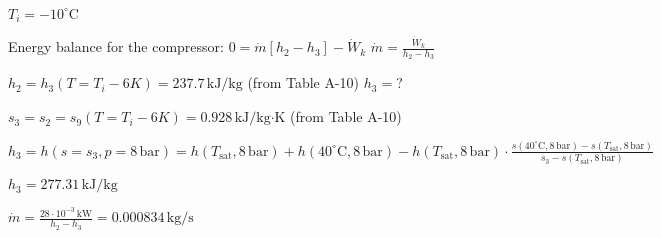 \( T_i = -10^\circ \text{C} \)  

Energy balance for the compressor:  
\( 0 = \dot{m} [h_2 - h_3] - \dot{W}_k \)  
\( \dot{m} = \frac{\dot{W}_k}{h_2 - h_3} \)  

\( h_2 = h_3 (T = T_i - 6K) = 237.7 \, \text{kJ/kg} \) (from Table A-10)  
\( h_3 = ? \)  

\( s_3 = s_2 = s_9 (T = T_i - 6K) = 0.928 \, \text{kJ/kg·K} \) (from Table A-10)  

\( h_3 = h(s = s_3, p = 8 \, \text{bar}) = h(T_{\text{sat}}, 8 \, \text{bar}) + h(40^\circ \text{C}, 8 \, \text{bar}) - h(T_{\text{sat}}, 8 \, \text{bar}) \cdot \frac{s(40^\circ \text{C}, 8 \, \text{bar}) - s(T_{\text{sat}}, 8 \, \text{bar})}{s_3 - s(T_{\text{sat}}, 8 \, \text{bar})} \)  

\( h_3 = 277.31 \, \text{kJ/kg} \)  

\( \dot{m} = \frac{28 \cdot 10^{-3} \, \text{kW}}{h_2 - h_3} = 0.000834 \, \text{kg/s} \)